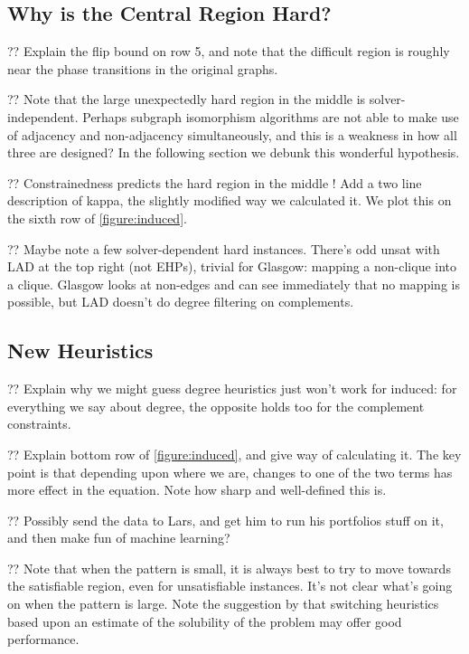 \documentclass[letterpaper]{article}
\begin{document}
\subsection{Why is the Central Region Hard?}

?? Explain the flip bound on row 5, and note that the difficult region is roughly near the phase
transitions in the original graphs.

?? Note that the large unexpectedly hard region in the middle is solver-independent. Perhaps
subgraph isomorphism algorithms are not able to make use of adjacency and non-adjacency
simultaneously, and this is a weakness in how all three are designed? In the following section we
debunk this wonderful hypothesis.

?? Constrainedness predicts the hard region in the middle \citep{Gent:1996:Kappa}! Add a two line
description of kappa, the slightly modified way we calculated it. We plot this on the sixth row of
\cref{figure:induced}.

?? Maybe note a few solver-dependent hard instances.  There's odd unsat with LAD at the top right
(not EHPs), trivial for Glasgow: mapping a non-clique into a clique. Glasgow looks at non-edges and
can see immediately that no mapping is possible, but LAD doesn't do degree filtering on complements.

\subsection{New Heuristics}

?? Explain why we might guess degree heuristics just won't work for induced: for everything we say
about degree, the opposite holds too for the complement constraints.

?? Explain bottom row of \cref{figure:induced}, and give way of calculating it. The key point is
that depending upon where we are, changes to one of the two terms has more effect in the equation.
Note how sharp and well-defined this is.

?? Possibly send the data to Lars, and get him to run his portfolios stuff on it, and then make fun
of machine learning?

?? Note that when the pattern is small, it is always best to try to move towards the satisfiable
region, even for unsatisfiable instances. It's not clear what's going on when the pattern is large.
Note the suggestion by \citet{Walsh:1998} that switching heuristics based upon an estimate of the
solubility of the problem may offer good performance.
\end{document}
